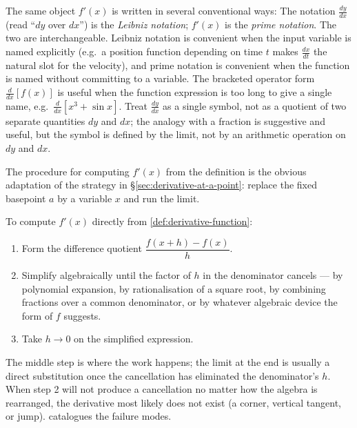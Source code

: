 \begin{caution}
The same object \(f'(x)\) is written in several conventional ways:
The notation \(\frac{dy}{dx}\) (read ``\(dy\) over \(dx\)'') is the \emph{Leibniz notation}; \(f'(x)\) is the \emph{prime notation}. The two are interchangeable. Leibniz notation is convenient when the input variable is named explicitly (e.g.\ a position function depending on time \(t\) makes \(\frac{dx}{dt}\) the natural slot for the velocity), and prime notation is convenient when the function is named without committing to a variable. The bracketed operator form \(\frac{d}{dx}[f(x)]\) is useful when the function expression is too long to give a single name, e.g.\ \(\frac{d}{dx}[x^{3} + \sin x]\). Treat \(\frac{dy}{dx}\) as a single symbol, not as a quotient of two separate quantities \(dy\) and \(dx\); the analogy with a fraction is suggestive and useful, but the symbol is defined by the limit, not by an arithmetic operation on \(dy\) and \(dx\).
\end{caution}

The procedure for computing \(f'(x)\) from the definition is the obvious adaptation of the strategy in §\ref{sec:derivative-at-a-point}: replace the fixed basepoint \(a\) by a variable \(x\) and run the limit.

\begin{strategy}
To compute \(f'(x)\) directly from \cref{def:derivative-function}:
\begin{enumerate}
    \item Form the difference quotient \(\dfrac{f(x + h) - f(x)}{h}\).
    \item Simplify algebraically until the factor of \(h\) in the denominator cancels --- by polynomial expansion, by rationalisation of a square root, by combining fractions over a common denominator, or by whatever algebraic device the form of \(f\) suggests.
    \item Take \(h \to 0\) on the simplified expression.
\end{enumerate}
The middle step is where the work happens; the limit at the end is usually a direct substitution once the cancellation has eliminated the denominator's \(h\). When step 2 will not produce a cancellation no matter how the algebra is rearranged, the derivative most likely does not exist (a corner, vertical tangent, or jump).  catalogues the failure modes.
\end{strategy}

